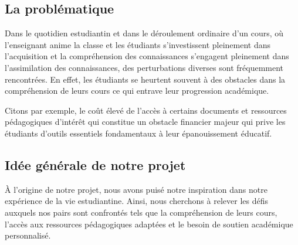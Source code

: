 \subsection{La problématique}
Dans le quotidien estudiantin et dans le déroulement ordinaire d'un cours, où l'enseignant anime la classe et les étudiants s'investissent pleinement dans l'acquisition et la compréhension des connaissances s'engagent pleinement dans l'assimilation des connaissances, des perturbations diverses sont fréquemment rencontrées. En effet, les étudiants se heurtent souvent à des obstacles dans la compréhension de leurs cours ce qui entrave leur progression académique.

\vspace{0.5em}

\vspace{0.5em}
\noindent Citons par exemple, le coût élevé de l’accès à certains documents et ressources pédagogiques d’intérêt qui constitue un obstacle financier majeur qui prive les étudiants d’outils essentiels fondamentaux à leur épanouissement éducatif.

\subsection{Idée générale de notre projet}
À l'origine de notre projet, nous avons puisé notre inspiration dans notre expérience de la vie estudiantine. Ainsi, nous cherchons à relever les défis auxquels nos pairs sont confrontés tels que la compréhension de leurs cours, l’accès aux ressources pédagogiques adaptées et le besoin de soutien académique personnalisé.

\vspace{0.5em}


